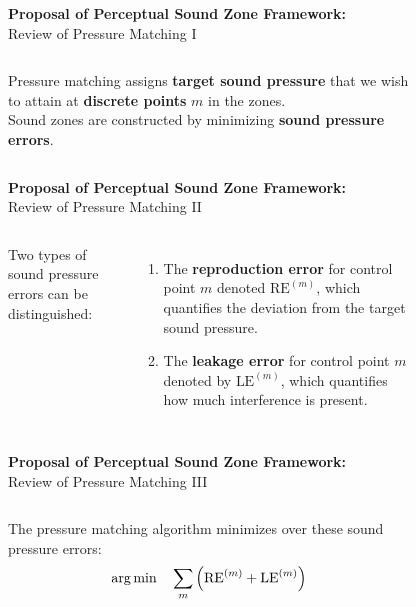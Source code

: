 \documentclass[aspectratio=169]{beamer}
\begin{document}
\begin{frame}{\textbf{Proposal of Perceptual Sound Zone Framework:}\\ Review of Pressure Matching I}
    \begin{columns}[c]
        Pressure matching assigns \textbf{target sound pressure} that we wish to attain at \textbf{discrete points} $m$ in the zones.\\
        \vspace{10pt}
        Sound zones are constructed by minimizing \textbf{sound pressure errors}.
        \begin{figure}[]
            \centering
            \scalebox{0.7}{}
        \end{figure}
    \end{columns}
\end{frame}

\begin{frame}{\textbf{Proposal of Perceptual Sound Zone Framework:}\\ Review of Pressure Matching II}
    \begin{columns}[c]
        Two types of sound pressure errors can be distinguished:
        \vspace{7pt}
        \begin{enumerate}
        \item The \textbf{reproduction error} for control point $m$ denoted $\text{RE}^{(m)}$, 
            which quantifies the deviation from the target sound pressure.     
        \item The \textbf{leakage error} for control point $m$ denoted by $\text{LE}^{(m)}$, 
            which quantifies how much interference is present. 
        \end{enumerate}
        \begin{figure}[]
            \centering
            \scalebox{0.7}{}
        \end{figure}
    \end{columns}
\end{frame}

\begin{frame}{\textbf{Proposal of Perceptual Sound Zone Framework:}\\ Review of Pressure Matching III}
    \begin{columns}[c]
        The pressure matching algorithm minimizes over these sound pressure errors:
        \begin{equation}
            \operatorname*{arg\,min}_{}\quad \sum_m \left(\text{RE}^{(m)} + \text{LE}^{(m)}\right)
        \end{equation}
        \begin{figure}[]
            \centering
            \scalebox{0.7}{}
        \end{figure}
    \end{columns}
\end{frame}
\end{document}
